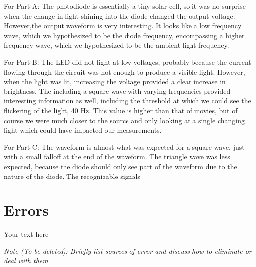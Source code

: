 \documentclass[10pt]{article}
\begin{document}
For Part A: The photodiode is essentially a tiny solar cell, so it was no surprise when the change in light shining into the diode changed the output voltage. However,the output waveform is very interesting. It looks like a low frequency wave, which we hypothesized to be the diode frequency, encompassing a higher frequency wave, which we hypothesized to be the ambient light frequency.

For Part B: The LED did not light at low voltages, probably because the current flowing through the circuit was not enough to produce a visible light. However, when the light was lit, increasing the voltage provided a clear increase in brightness. The including a square wave with varying frequencies provided interesting information as well, including the threshold at which we could see the flickering of the light, 40 Hz. This value is higher than that of movies, but of course we were much closer to the source and only looking at a single changing light which could have impacted our measurements. 

For Part C: The waveform is almost what was expected for a square wave, just with a small falloff at the end of the waveform. The triangle wave was less expected, because the diode should only see part of the waveform due to the nature of the diode. The recognizable signals

\medskip



\section{Errors}

Your text here

\medskip

\textit{Note (To be deleted): Briefly list sources of error and discuss how to eliminate or deal with them}
\end{document}
